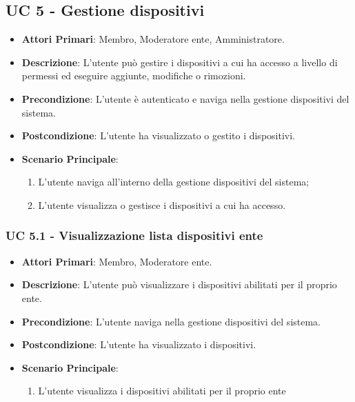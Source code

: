 	\subsection{UC 5 - Gestione dispositivi}
		
		\begin{itemize}
			\item \textbf{Attori Primari}: Membro, Moderatore ente, Amministratore.
			\item \textbf{Descrizione}: L'utente può gestire i dispositivi a cui ha accesso a livello di permessi ed eseguire aggiunte, modifiche o rimozioni.
			\item \textbf{Precondizione}: L'utente è autenticato e naviga nella gestione dispositivi del sistema.
			\item \textbf{Postcondizione}: L'utente ha visualizzato o gestito i dispositivi.
			\item \textbf{Scenario Principale}:
			\begin{enumerate}
				\item{L'utente naviga all'interno della gestione dispositivi del sistema;}
				\item{L'utente visualizza o gestisce i dispositivi a cui ha accesso.}
			\end{enumerate}
		\end{itemize}
			
			
			\subsubsection{UC 5.1 - Visualizzazione lista dispositivi ente}
			\begin{itemize}
				\item \textbf{Attori Primari}: Membro, Moderatore ente.
				\item \textbf{Descrizione}: L'utente può visualizzare i dispositivi abilitati per il proprio ente.
				\item \textbf{Precondizione}: L'utente naviga nella gestione dispositivi del sistema.
				\item \textbf{Postcondizione}: L'utente ha visualizzato i dispositivi.
				\item \textbf{Scenario Principale}:
				\begin{enumerate}
					\item{L'utente visualizza i dispositivi abilitati per il proprio ente}
				\end{enumerate}
			\end{itemize}
			
